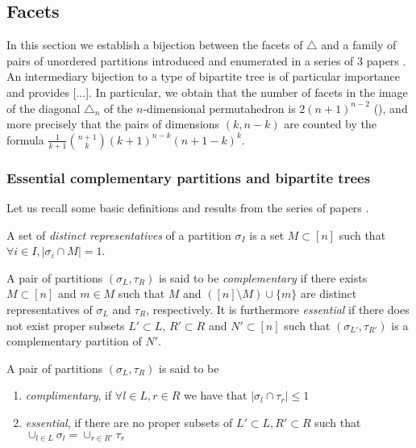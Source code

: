\subsection{Facets}

In this section we establish a bijection between the facets of $\triangle$ and a family of pairs of unordered partitions introduced and enumerated in a series of 3 papers \cite{chen1969computer,chen1971tables,kajitani1982number}. An intermediary bijection to a type of bipartite tree is of particular importance and provides [...].
In particular, we obtain that the number of facets in the image of the diagonal $\triangle_n$ of the $n$-dimensional permutahedron is $2(n+1)^{n-2}$ (), and more precisely that the pairs of dimensions $(k,n-k)$ are counted by the formula $\frac{1}{k+1}\binom{n+1}{k}(k+1)^{n-k}(n+1-k)^{k}$. 


\subsubsection{Essential complementary partitions and bipartite trees}
Let us recall some basic definitions and results from the series of papers \cite{chen1969computer,chen1971tables,kajitani1982number}.

\begin{definition}
A set of \emph{distinct representatives} of a partition $\sigma_I$ is a set $M\subset [n]$ such that $\forall i \in I,|\sigma_i \cap M| = 1$.
\end{definition}

\begin{definition}
A pair of partitions $(\sigma_L,\tau_R)$ is said to be \emph{complementary} if there exists $M\subset [n]$ and $m \in M$ such that $M$ and $([n]\setminus M) \cup \{m\}$ are distinct representatives of $\sigma_L$ and $\tau_R$, respectively.
It is furthermore \emph{essential} if there does not exist proper subsets $ L'\subset L$, $R'\subset R$ and $N' \subset [n]$ such that $(\sigma_{L'},\tau_{R'})$ is a complementary partition of $N'$.
\end{definition}
\begin{definition}
A pair of partitions $(\sigma_L,\tau_R)$ is said to be 
\begin{enumerate}
	\item \emph{complimentary}, if $\forall l\in L, r\in R$ we have that $|\sigma_l \cap \tau_r| \leq 1$
	\item \emph{essential}, if there are no proper subsets of $L'\subset L,R'\subset R$ such that $\cup_{l \in L} \sigma_l = \cup_{r \in R'} \tau_r$
\end{enumerate}	

\end{definition}

